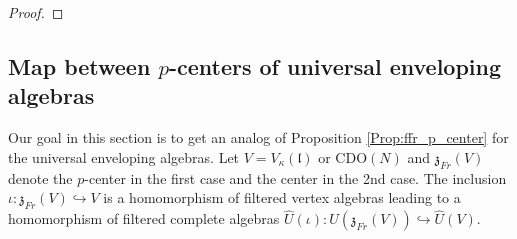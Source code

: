 \documentclass{amsart}
\theoremstyle{definition}
\newcommand{\Ring}{\mathsf{R}}
\newcommand{\g}{\mathfrak{g}}
\newcommand{\ffr}{\mathrm{ffr}}
\newcommand{\lf}{\mathfrak{l}}
\newcommand{\Jet}{\mathscr{J}}
\newcommand{\frp}{\mathfrak{p}}
\newcommand{\AS}{\mathsf{AS}}
\newcommand{\CDO}{\mathrm{CDO}}
\newcommand{\frz}{\mathfrak{z}}
\numberwithin{equation}{section}
\begin{document}
\begin{proof}
\end{proof}

\subsection{Map between $p$-centers of universal enveloping algebras}\label{SSS_univ_env_map}
Our goal in this section is to get an analog of Proposition \ref{Prop:ffr_p_center} for 
the universal enveloping algebras. 
Let $V=V_\kappa(\lf)$ or $\CDO(N)$ and $\frz_{Fr}(V)$ denote the $p$-center in the first case and the center in the 2nd case. 
The inclusion $\iota:\frz_{Fr}(V)\hookrightarrow V$ is a homomorphism of filtered vertex algebras leading to a homomorphism of filtered complete algebras $\widehat{U}(\iota):\widehat{U}(\frz_{Fr}(V))\hookrightarrow \widehat{U}(V)$.
\end{document}
